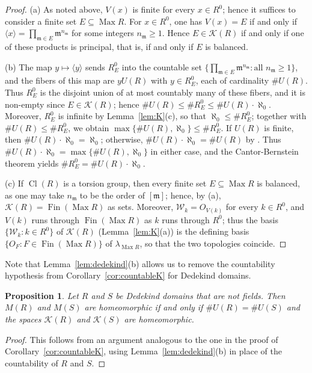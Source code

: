 \documentclass[12pt,reqno,a4paper]{amsart}
\newcommand{\K}{\mathcal{K}}
\newcommand{\W}{\mathcal{W}}
\newcommand{\m}{\mathfrak{m}}
\DeclareMathOperator{\Max}{Max}
\DeclareMathOperator{\Fin}{Fin}
\DeclareMathOperator{\Cl}{Cl}
\theoremstyle{plain}
\newtheorem{proposition}[theorem]{Proposition}
\theoremstyle{definition}
\begin{document}
\begin{proof}
(a) As noted above, $V(x)$ is finite for every $x\in R^0$; hence it suffices to consider a finite set $E\subseteq\Max R$. For $x\in R^0$, one has $V(x)=E$ if and only if $\langle x\rangle=\prod\limits_{\m\in E}\m^{n_\m}$ for some integers $n_\m\geq1$. Hence $E\in\K(R)$ if and only if one of these products is principal, that is, if and only if $E$ is balanced.

(b) The map $y\mapsto\langle y\rangle$ sends $R^0_E$ into the countable set $\bigl\{\prod\limits_{\m\in E}\m^{n_\m}:\text{all }n_\m\geq1\bigr\}$, and the fibers of this map are $yU(R)$ with $y\in R^0_E$, each of cardinality $\#U(R)$. Thus $R^0_E$ is the disjoint union of at most countably many of these fibers, and it is non-empty since $E\in\K(R)$; hence $\#U(R)\leq\#R^0_E\leq\#U(R)\cdot\aleph_0$. Moreover, $R^0_E$ is infinite by Lemma~\ref{lem:K}(c), so that $\aleph_0\leq\#R^0_E$; together with $\#U(R)\leq\#R^0_E$, we obtain $\max\{\#U(R),\aleph_0\}\leq\#R^0_E$. If $U(R)$ is finite, then $\#U(R)\cdot\aleph_0=\aleph_0$; otherwise, $\#U(R)\cdot\aleph_0=\#U(R)$ by \cite[(3.14)]{Jech}. Thus $\#U(R)\cdot\aleph_0=\max\{\#U(R),\aleph_0\}$ in either case, and the Cantor-Bernstein theorem \cite[Theorem~3.2]{Jech} yields $\#R^0_E=\#U(R)\cdot\aleph_0$.

(c) If $\Cl(R)$ is a torsion group, then every finite set $E\subseteq\Max R$ is balanced, as one may take $n_\m$ to be the order of $[\m]$; hence, by (a), $\K(R)=\Fin(\Max R)$ as sets. Moreover, $\W_k=O_{V(k)}$ for every $k\in R^0$, and $V(k)$ runs through $\Fin(\Max R)$ as $k$ runs through $R^0$; thus the basis $\{\W_k:k\in R^0\}$ of $\K(R)$ (Lemma~\ref{lem:K}(a)) is the defining basis $\{O_F:F\in\Fin(\Max R)\}$ of $\lambda_{\Max R}$, so that the two topologies coincide.
\end{proof}

Note that Lemma~\ref{lem:dedekind}(b) allows us to remove the countability hypothesis from Corollary~\ref{cor:countableK} for Dedekind domains.

\begin{proposition}\label{prop:dedekind}
Let $R$ and $S$ be Dedekind domains that are not fields. Then $M(R)$ and $M(S)$ are homeomorphic if and only if $\#U(R)=\#U(S)$ and the spaces $\K(R)$ and $\K(S)$ are homeomorphic.
\end{proposition}

\begin{proof}
This follows from an argument analogous to the one in the proof of Corollary~\ref{cor:countableK}, using Lemma~\ref{lem:dedekind}(b) in place of the countability of $R$ and $S$.
\end{proof}
\end{document}
